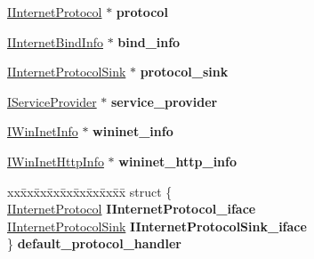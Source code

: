 \begin{DoxyCompactItemize}
\mbox{\label{struct_bind_protocol_aa3c8bfcc0c0477059d9921e021f22577}} 
\hyperlink{interface_i_internet_protocol}{I\+Internet\+Protocol} $\ast$ {\bfseries protocol}
\item 
\mbox{\label{struct_bind_protocol_ab04e586c621ca5e354a6f4ca0002357e}} 
\hyperlink{interface_i_internet_bind_info}{I\+Internet\+Bind\+Info} $\ast$ {\bfseries bind\+\_\+info}
\item 
\mbox{\label{struct_bind_protocol_a89f0329c8547c94115958472d3b7e6a1}} 
\hyperlink{interface_i_internet_protocol_sink}{I\+Internet\+Protocol\+Sink} $\ast$ {\bfseries protocol\+\_\+sink}
\item 
\mbox{\label{struct_bind_protocol_a42c495541de8d939f987046ee8a610f5}} 
\hyperlink{interface_i_service_provider}{I\+Service\+Provider} $\ast$ {\bfseries service\+\_\+provider}
\item 
\mbox{\label{struct_bind_protocol_ad9a1ef8f8ad9ed5d203317702ab3565b}} 
\hyperlink{interface_i_win_inet_info}{I\+Win\+Inet\+Info} $\ast$ {\bfseries wininet\+\_\+info}
\item 
\mbox{\label{struct_bind_protocol_aade79818493b5ad757cff226eec0c3e7}} 
\hyperlink{interface_i_win_inet_http_info}{I\+Win\+Inet\+Http\+Info} $\ast$ {\bfseries wininet\+\_\+http\+\_\+info}
\item 
\mbox{\label{struct_bind_protocol_a50444fe864fdce4f84d25167a7f9a4be}} 
\begin{tabbing}
xx\=xx\=xx\=xx\=xx\=xx\=xx\=xx\=xx\=\kill
struct \{\\
\>\hyperlink{interface_i_internet_protocol}{IInternetProtocol} {\bfseries IInternetProtocol\_iface}\\
\>\hyperlink{interface_i_internet_protocol_sink}{IInternetProtocolSink} {\bfseries IInternetProtocolSink\_iface}\\
\} {\bfseries default\_protocol\_handler}\\


\end{tabbing}
\end{DoxyCompactItemize}
